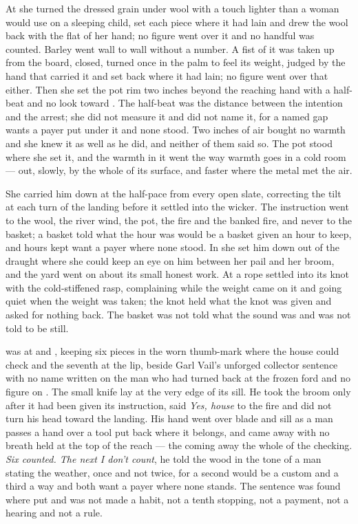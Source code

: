At  she turned the dressed grain under wool with a touch lighter than a woman would use on a sleeping child, set each piece where it had lain and drew the wool back with the flat of her hand; no figure went over it and no handful was counted. Barley went wall to wall without a number. A fist of it was taken up from the board, closed, turned once in the palm to feel its weight, judged by the hand that carried it and set back where it had lain; no figure went over that either. Then she set the pot rim two inches beyond the reaching hand with a half-beat and no look toward . The half-beat was the distance between the intention and the arrest; she did not measure it and did not name it, for a named gap wants a payer put under it and none stood. Two inches of air bought no warmth and she knew it as well as he did, and neither of them said so. The pot stood where she set it, and the warmth in it went the way warmth goes in a cold room --- out, slowly, by the whole of its surface, and faster where the metal met the air.

\scenebreak

She carried him down  at the half-pace from every open slate, correcting the tilt at each turn of the landing before it settled into the wicker. The instruction went to the wool, the river wind, the pot, the fire and the banked fire, and never to the basket; a basket told what the hour was would be a basket given an hour to keep, and hours kept want a payer where none stood. In  she set him down out of the draught where she could keep an eye on him between her pail and her broom, and the yard went on about its small honest work. At  a rope settled into its knot with the cold-stiffened rasp, complaining while the weight came on it and going quiet when the weight was taken; the knot held what the knot was given and asked for nothing back. The basket was not told what the sound was and was not told to be still.

 was at  and , keeping six pieces in the worn thumb-mark where the house could check and the seventh at the lip, beside Garl Vail's unforged collector sentence with no name written on the man who had turned back at the frozen ford and no figure on . The small knife lay at the very edge of its sill. He took the broom only after it had been given its instruction, said \emph{Yes, house} to the fire and did not turn his head toward the landing. His hand went over blade and sill as a man passes a hand over a tool put back where it belongs, and came away with no breath held at the top of the reach --- the coming away the whole of the checking. \emph{Six counted. The next I don't count}, he told the wood in the tone of a man stating the weather, once and not twice, for a second would be a custom and a third a way and both want a payer where none stands. The sentence was found where put and was not made a habit, not a tenth stopping, not a payment, not a hearing and not a rule.

